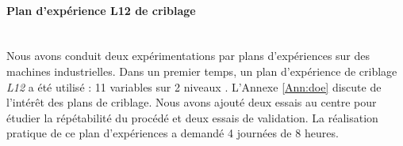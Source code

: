 
\newpage
\paragraph{Plan d'expérience L12 de criblage}\mbox{} \\
Nous avons conduit deux expérimentations par plans d'expériences sur des machines industrielles.
Dans un premier temps, un plan d'expérience de criblage \textit{L12} a été utilisé : 11 variables sur 2 niveaux \cite{plackett_design_1946}.
L'Annexe \ref{Ann:doe} discute de l'intérêt des plans de criblage.
Nous avons ajouté deux essais au centre pour étudier la répétabilité du procédé et deux essais de validation.
La réalisation pratique de ce plan d'expériences a demandé 4 journées de 8 heures.

\vspace{1cm}

\makeatletter
\newcommand*{\yncellcolor}{}
\def\yncellcolor\ignorespaces{}
\newcolumntype{m}{>{\yncellcolor}c}
\makeatother

